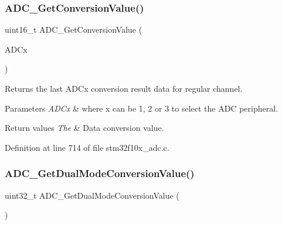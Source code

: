 \subsubsection{\texorpdfstring{A\+D\+C\+\_\+\+Get\+Conversion\+Value()}{ADC\_GetConversionValue()}}
{\footnotesize\ttfamily uint16\+\_\+t A\+D\+C\+\_\+\+Get\+Conversion\+Value (\begin{DoxyParamCaption}\item[{\hyperlink{struct_a_d_c___type_def}{A\+D\+C\+\_\+\+Type\+Def} $\ast$}]{A\+D\+Cx }\end{DoxyParamCaption})}



Returns the last A\+D\+Cx conversion result data for regular channel. 


\begin{DoxyParams}{Parameters}
{\em A\+D\+Cx} & where x can be 1, 2 or 3 to select the A\+DC peripheral. \\
\hline
\end{DoxyParams}

\begin{DoxyRetVals}{Return values}
{\em The} & Data conversion value. \\
\hline
\end{DoxyRetVals}


Definition at line 714 of file stm32f10x\+\_\+adc.\+c.

\mbox{\label{group___a_d_c___private___functions_gac5a4792dc29ef7ff6bfbce9f37e8a668}} 
\subsubsection{\texorpdfstring{A\+D\+C\+\_\+\+Get\+Dual\+Mode\+Conversion\+Value()}{ADC\_GetDualModeConversionValue()}}
{\footnotesize\ttfamily uint32\+\_\+t A\+D\+C\+\_\+\+Get\+Dual\+Mode\+Conversion\+Value (\begin{DoxyParamCaption}\item[{void}]{ }\end{DoxyParamCaption})}



